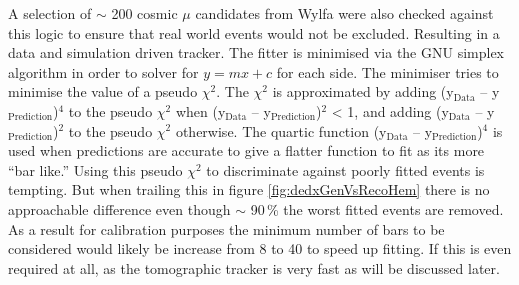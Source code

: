 A selection of $\sim$ 200 cosmic $\mu$ candidates from Wylfa were also checked against this logic to ensure that real world events would not be excluded. Resulting in a data and simulation driven tracker. The fitter is minimised via the GNU simplex algorithm \cite{galassi2002gnu} in order to solver for $y = mx + c$ for each side. The minimiser tries to minimise the value of a pseudo $\chi^2$. The $\chi^2$ is approximated by adding (y$_\textrm{{Data}}$ -- y$_\textrm{{Prediction}}$)$^4$ to the pseudo $\chi^2$ when (y$_\textrm{{Data}}$ -- y$_\textrm{{Prediction}}$)$^2$ < 1, and adding (y$_\textrm{{Data}}$ -- y$_\textrm{{Prediction}}$)$^2$ to the pseudo $\chi^2$ otherwise. The quartic function (y$_\textrm{{Data}}$ -- y$_\textrm{{Prediction}}$)$^4$ is used when predictions are accurate to give a flatter function to fit as its more ``bar like.'' Using this pseudo $\chi^2$ to discriminate against poorly fitted events is tempting. But when trailing this in figure \ref{fig:dedxGenVsRecoHem} there is no approachable difference even though $\sim$ 90\,\% the worst fitted events are removed. As a result for calibration purposes the minimum number of bars to be considered would likely be increase from 8 to 40 to speed up fitting. If this is even required at all, as the tomographic tracker is very fast as will be discussed later. 


